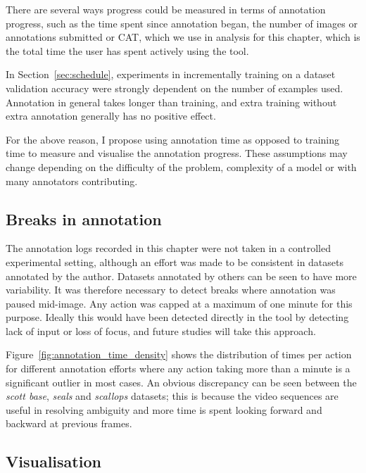 There are several ways progress could be measured in terms of annotation progress, such as the time spent since annotation began, the number of images or annotations submitted or \gls{CAT}, which we use in analysis for this chapter, which is the total time the user has spent actively using the tool.
 
In Section~\ref{sec:schedule}, experiments in incrementally training on a dataset validation accuracy were strongly dependent on the number of examples used. Annotation in general takes longer than training, and extra training without extra annotation generally has no positive effect.

For the above reason, I propose using annotation time as opposed to training time to measure and visualise the annotation progress. These assumptions  may change depending on the difficulty of the problem, complexity of a model or with many annotators contributing.



\subsection {Breaks in annotation}
\label{sec:break_detection}

The annotation logs recorded in this chapter were not taken in a controlled experimental setting, although an effort was made to be consistent in datasets annotated by the author. Datasets annotated by others can be seen to have more variability. It was therefore necessary to detect breaks where annotation was paused mid-image. Any action was capped at a maximum of one minute for this purpose. Ideally this would have been detected directly in the tool by detecting lack of input or loss of focus, and future studies will take this approach. 

Figure~\ref{fig:annotation_time_density} shows the distribution of times per action for different annotation efforts where any action taking more than a minute is a significant outlier in most cases. An obvious discrepancy can be seen between the \emph{scott base}, \emph{seals} and \emph{scallops} datasets; this is because the video sequences are useful in resolving ambiguity and more time is spent looking forward and backward at previous frames.

\subsection{Visualisation}
\label{sec:visualisation}

